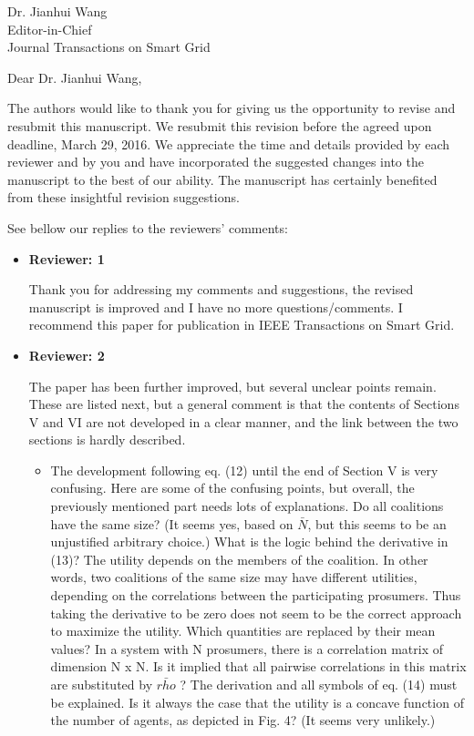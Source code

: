 \documentclass{letter}
\begin{document}
\begin{letter}{Dr. Jianhui Wang \\ Editor-in-Chief \\ Journal Transactions on Smart Grid } %


\opening{ Dear Dr. Jianhui Wang,}


The authors would like to thank you for giving us the opportunity to revise and resubmit this manuscript. We resubmit this revision before the agreed upon deadline, March 29, 2016. We appreciate the time and details provided by each reviewer and by you and have incorporated the suggested changes into the manuscript to the best of our ability. The manuscript has certainly benefited from these insightful revision suggestions.


See bellow our replies to the reviewers’ comments:


\begin{itemize}

	\item \textbf{Reviewer: 1}

Thank you for addressing my comments and suggestions, the revised manuscript is improved and I have no more questions/comments. I recommend this paper for publication in IEEE Transactions on Smart Grid.

	\item \textbf{Reviewer: 2}

The paper has been further improved, but several unclear points remain. These are listed next, but a general comment is that the contents of Sections V and VI are not developed in a clear manner, and the link between the two sections is hardly described.
	\begin{itemize}
	
		\item The development following eq. (12) until the end of Section V is very confusing. Here are some of the confusing points, but overall, the previously mentioned part needs lots of explanations. Do all coalitions have the same size? (It seems yes, based on $ \bar{N} $, but this seems to be an unjustified arbitrary choice.) What is the logic behind the derivative in (13)? The utility depends on the members of the coalition. In other words, two coalitions of the same size may have different utilities, depending on the correlations between the participating prosumers. Thus taking the derivative to be zero does not seem to be the correct approach to maximize the utility. Which quantities are replaced by their mean values? In a system with N prosumers, there is a correlation matrix of dimension N x N. Is it implied that all pairwise correlations in this matrix are substituted by $ \bar{rho} $ ? The derivation and all symbols of eq. (14) must be explained. Is it always the case that the utility is a concave function of the number of agents, as depicted in Fig. 4? (It seems very unlikely.)
\\


\end{itemize}
\end{itemize}
\end{letter}
\end{document}
